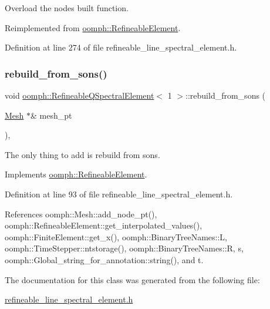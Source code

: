 Overload the nodes built function. 



Reimplemented from \hyperlink{classoomph_1_1RefineableElement_a50758228db823d72ea8da23dbb000901}{oomph\+::\+Refineable\+Element}.



Definition at line 274 of file refineable\+\_\+line\+\_\+spectral\+\_\+element.\+h.

\mbox{\label{classoomph_1_1RefineableQSpectralElement_3_011_01_4_a7a5d6ced6c1c327f779e456303908c0e}} 
\subsubsection{\texorpdfstring{rebuild\+\_\+from\+\_\+sons()}{rebuild\_from\_sons()}}
{\footnotesize\ttfamily void \hyperlink{classoomph_1_1RefineableQSpectralElement}{oomph\+::\+Refineable\+Q\+Spectral\+Element}$<$ 1 $>$\+::rebuild\+\_\+from\+\_\+sons (\begin{DoxyParamCaption}\item[{\hyperlink{classoomph_1_1Mesh}{Mesh} $\ast$\&}]{mesh\+\_\+pt }\end{DoxyParamCaption})\hspace{0.3cm}{\ttfamily [inline]}, {\ttfamily [virtual]}}



The only thing to add is rebuild from sons. 



Implements \hyperlink{classoomph_1_1RefineableElement_a33324be27833fa4b78279d17158215fa}{oomph\+::\+Refineable\+Element}.



Definition at line 93 of file refineable\+\_\+line\+\_\+spectral\+\_\+element.\+h.



References oomph\+::\+Mesh\+::add\+\_\+node\+\_\+pt(), oomph\+::\+Refineable\+Element\+::get\+\_\+interpolated\+\_\+values(), oomph\+::\+Finite\+Element\+::get\+\_\+x(), oomph\+::\+Binary\+Tree\+Names\+::L, oomph\+::\+Time\+Stepper\+::ntstorage(), oomph\+::\+Binary\+Tree\+Names\+::R, s, oomph\+::\+Global\+\_\+string\+\_\+for\+\_\+annotation\+::string(), and t.



The documentation for this class was generated from the following file\+:\begin{DoxyCompactItemize}
\item 
\hyperlink{refineable__line__spectral__element_8h}{refineable\+\_\+line\+\_\+spectral\+\_\+element.\+h}\end{DoxyCompactItemize}
